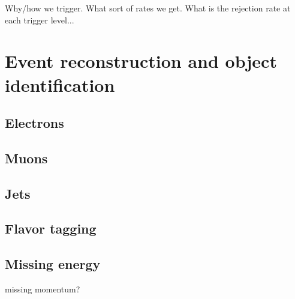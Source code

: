 {\color{red} Why/how we trigger. What sort of rates we get. What is the
rejection rate at each trigger level...}

\section{Event reconstruction and object identification}

\subsection{Electrons} 
\label{sec:elctrons}

\subsection{Muons} 
\label{sec:muons}

\subsection{Jets} 
\label{sec:jets}

\subsection{Flavor tagging} 
\label{sec:flavor_tagging}

\subsection{Missing energy} 
\label{sec:met}

{\color{red} missing momentum?}
